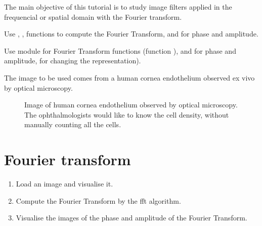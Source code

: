 \def\difficulty{1}

\begin{note}The main objective of this tutorial is to study image filters applied in the frequencial or spatial domain with the Fourier transform. \end{note}

\begin{mcomment}
\begin{mremark}
Use  , ,  functions to compute the Fourier Transform,  and  for phase and amplitude.
\end{mremark}
\end{mcomment}
\begin{pcomment}
\begin{premark}
Use module   for Fourier Transform functions (function ),  and  for phase and amplitude,  for changing the representation).
\end{premark}
\end{pcomment}

\noindent The image to be used comes from a human cornea endothelium observed ex vivo by optical microscopy. 

\begin{figure}[htbp]
\centering\caption{Image of human cornea endothelium observed by optical microscopy. The ophthalmologists would like to know the cell density, without manually counting all the cells.}%
\hfill
{}%
\label{fig:cornea}
\end{figure}

\section{Fourier transform}

\begin{qbox}
\begin{enumerate}
	\item Load an image and visualise it.
	\item Compute the Fourier Transform by the fft algorithm.
	\item Visualise the images of the phase and amplitude of the Fourier Transform.
\end{enumerate}
\end{qbox}

